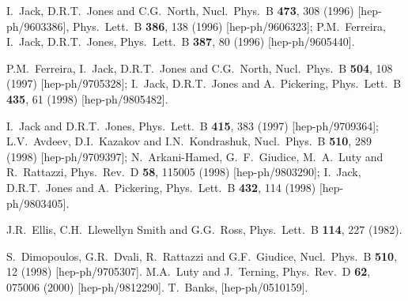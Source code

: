 \documentclass[11pt]{article}
\begin{document}
\begin{thebibliography}{999}
I.~Jack, D.R.T.~Jones and C.G.~North,
  Nucl.\ Phys.\ B {\bf 473}, 308 (1996)
  [hep-ph/9603386],
  Phys.\ Lett.\ B {\bf 386}, 138 (1996)
  [hep-ph/9606323];
P.M.~Ferreira, I.~Jack, D.R.T.~Jones,
  Phys.\ Lett.\ B {\bf 387}, 80 (1996)
  [hep-ph/9605440].

P.M.~Ferreira, I.~Jack, D.R.T.~Jones and C.G.~North,
  Nucl.\ Phys.\ B {\bf 504}, 108 (1997)
  [hep-ph/9705328];
I.~Jack, D.R.T.~Jones and A.~Pickering,
  Phys.\ Lett.\ B {\bf 435}, 61 (1998)
  [hep-ph/9805482].

I.~Jack and D.R.T.~Jones,
  Phys.\ Lett.\ B {\bf 415}, 383 (1997)
  [hep-ph/9709364];
L.V.~Avdeev, D.I.~Kazakov and I.N.~Kondrashuk,
  Nucl.\ Phys.\ B {\bf 510}, 289 (1998)
  [hep-ph/9709397];
N.~Arkani-Hamed, G.~F.~Giudice, M.~A.~Luty and R.~Rattazzi,
  Phys.\ Rev.\ D {\bf 58}, 115005 (1998)
  [hep-ph/9803290];
I.~Jack, D.R.T.~Jones and A.~Pickering,
  Phys.\ Lett.\ B {\bf 432}, 114 (1998)
  [hep-ph/9803405].

  J.R.~Ellis, C.H.~Llewellyn Smith and G.G.~Ross,
  Phys.\ Lett.\  B {\bf 114}, 227 (1982).

  S.~Dimopoulos, G.R.~Dvali, R.~Rattazzi and G.F.~Giudice,
  Nucl.\ Phys.\  B {\bf 510}, 12 (1998)
  [hep-ph/9705307].
%
  M.A.~Luty and J.~Terning,
  Phys.\ Rev.\  D {\bf 62}, 075006 (2000)
  [hep-ph/9812290].
%
  T.~Banks,
  [hep-ph/0510159].


\end{thebibliography}
\end{document}
